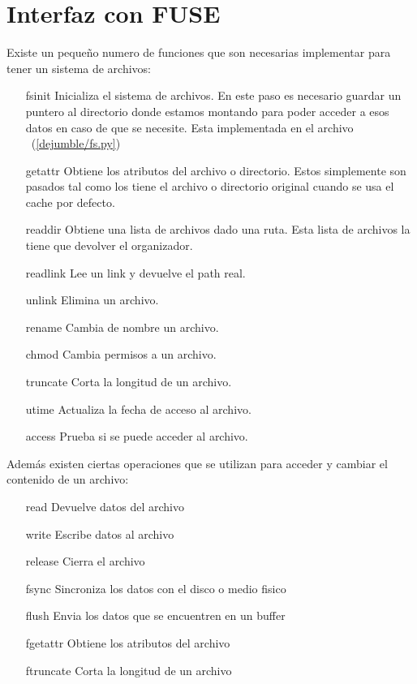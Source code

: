 \section{Interfaz con FUSE}

Existe un pequeño numero de funciones que son necesarias implementar para tener un sistema de archivos:

\begin{itemize}
\item[fsinit] Inicializa el sistema de archivos. En este paso es necesario guardar un puntero al directorio donde estamos montando para poder acceder a esos datos en caso de que se necesite. Esta implementada en el archivo ~(\ref{dejumble/fs.py})
\item[getattr] Obtiene los atributos del archivo o directorio. Estos simplemente son pasados tal como los tiene el archivo o directorio original cuando se usa el cache por defecto.
\item[readdir] Obtiene una lista de archivos dado una ruta. Esta lista de archivos la tiene que devolver el organizador.
\item[readlink] Lee un link	y devuelve el path real.
\item[unlink] Elimina un archivo.
\item[rename] Cambia de nombre un archivo.
\item[chmod] Cambia permisos a un archivo.
\item[truncate] Corta la longitud de un archivo.
\item[utime] Actualiza la fecha de acceso al archivo.
\item[access] Prueba si se puede acceder al archivo.
\end{itemize}

Además existen ciertas operaciones que se utilizan para acceder y cambiar el contenido de un archivo:

\begin{itemize}
\item[read] Devuelve datos del archivo
\item[write] Escribe datos al archivo
\item[release] Cierra el archivo
\item[fsync] Sincroniza los datos con el disco o medio fisico
\item[flush] Envia los datos que se encuentren en un buffer
\item[fgetattr] Obtiene los atributos del archivo
\item[ftruncate] Corta la longitud de un archivo
\end{itemize}



